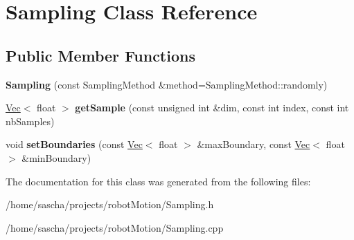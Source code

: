 \hypertarget{class_sampling}{\section{Sampling Class Reference}
\label{class_sampling}
}
\subsection*{Public Member Functions}
\begin{DoxyCompactItemize}
\item 
\hypertarget{class_sampling_ab4e77a1fb7e64f6d337e9143b2e7ef66}{{\bfseries Sampling} (const Sampling\-Method \&method=Sampling\-Method\-::randomly)}\label{class_sampling_ab4e77a1fb7e64f6d337e9143b2e7ef66}

\item 
\hypertarget{class_sampling_afb439f05570d873cf1742d20b87f83f1}{\hyperlink{class_vec}{Vec}$<$ float $>$ {\bfseries get\-Sample} (const unsigned int \&dim, const int index, const int nb\-Samples)}\label{class_sampling_afb439f05570d873cf1742d20b87f83f1}

\item 
\hypertarget{class_sampling_a05851d474e200665221b15fd3fcba56a}{void {\bfseries set\-Boundaries} (const \hyperlink{class_vec}{Vec}$<$ float $>$ \&max\-Boundary, const \hyperlink{class_vec}{Vec}$<$ float $>$ \&min\-Boundary)}\label{class_sampling_a05851d474e200665221b15fd3fcba56a}

\end{DoxyCompactItemize}


The documentation for this class was generated from the following files\-:\begin{DoxyCompactItemize}
\item 
/home/sascha/projects/robot\-Motion/Sampling.\-h\item 
/home/sascha/projects/robot\-Motion/Sampling.\-cpp\end{DoxyCompactItemize}
